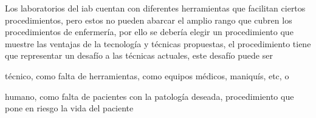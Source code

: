 \begin{itemize}
    Los laboratorios del \Gls{iab} cuentan con diferentes herramientas que
    facilitan ciertos procedimientos, pero estos no pueden abarcar el amplio
    rango que cubren los procedimientos de enfermería, por ello se debería
    elegir un procedimiento que muestre las ventajas de la tecnología y técnicas
    propuestas, el procedimiento tiene que representar un desafío a las técnicas
    actuales, este desafío puede ser 

    \begin{enumerate*}[label=\itshape\alph*\upshape.]
    \item técnico, como falta de herramientas, como equipos médicos, maniquís,
        etc, o
    \item humano, como falta de pacientes con la patología deseada,
        procedimiento que pone en riesgo la vida del paciente
    \end{enumerate*}
    
\end{itemize}
